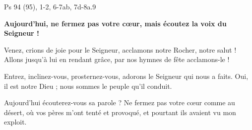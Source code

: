  Ps 94 (95), 1-2, 6-7ab, 7d-8a.9

\textbf{Aujourd’hui, ne fermez pas votre cœur,
mais écoutez la voix du Seigneur !}

\smallskip

Venez, crions de joie pour le Seigneur,
acclamons notre Rocher, notre salut !
Allons jusqu’à lui en rendant grâce,
par nos hymnes de fête acclamons-le !

\smallskip

Entrez, inclinez-vous, prosternez-vous,
adorons le Seigneur qui nous a faits.
Oui, il est notre Dieu ;
nous sommes le peuple qu’il conduit.

\smallskip

Aujourd’hui écouterez-vous sa parole ?
\og Ne fermez pas votre cœur comme au désert,
où vos pères m’ont tenté et provoqué,
et pourtant ils avaient vu mon exploit.\fg{}

